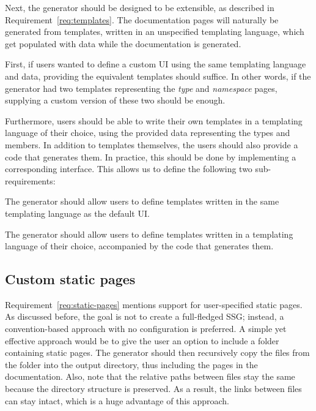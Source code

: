 Next, the generator should be designed to be extensible, as described in Requirement~\ref{req:templates}.
The documentation pages will naturally be generated from templates, written in an unspecified templating language, which get populated with data while the documentation is generated.

First, if users wanted to define a custom UI using the same templating language and data, providing the equivalent templates should suffice.
In other words, if the generator had two templates representing the \textit{type} and \textit{namespace} pages, supplying a custom version of these two should be enough.

Furthermore, users should be able to write their own templates in a templating language of their choice,
using the provided data representing the types and members.
In addition to templates themselves, the users should also provide a code that generates them.
In practice, this should be done by implementing a corresponding interface.
This allows us to define the following two sub-requirements:

\setcounter{subrequirementcounter}{2}
\setcounter{subrequirement}{0}

\begin{subrequirement}
    The generator should allow users to define templates written in the same templating language as the default UI.
    \label{subreq:custom-razor-templates}
\end{subrequirement}

\begin{subrequirement}
    The generator should allow users to define templates written in a templating language of their choice, accompanied by the code that generates them.
    \label{subreq:custom-template-lang}
\end{subrequirement}

\subsection*{Custom static pages}

Requirement~\ref{req:static-pages} mentions support for user-specified static pages.
As discussed before, the goal is not to create a full-fledged SSG; instead, a convention-based approach with no configuration is preferred.
A simple yet effective approach would be to give the user an option to include a folder containing static pages.
The generator should then recursively copy the files from the folder into the output directory, thus including the pages in the documentation.
Also, note that the relative paths between files stay the same because the directory structure is preserved.
As a result, the links between files can stay intact, which is a huge advantage of this approach.

